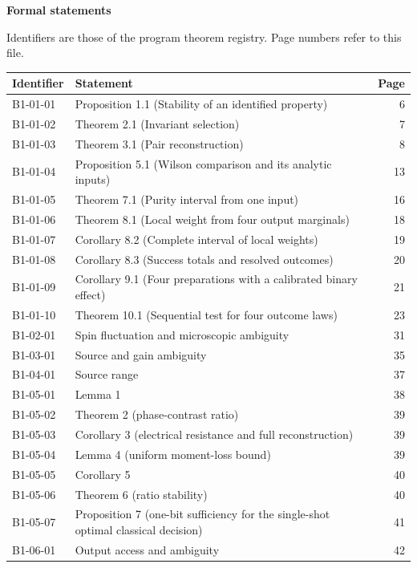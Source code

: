 \documentclass[11pt,a4paper]{article}
\begin{document}
\vspace{2mm}\textbf{Formal statements}\par\vspace{1mm}
{\footnotesize Identifiers are those of the program theorem registry. Page numbers refer to this file.\par}
{\footnotesize\begin{longtable}{@{}l>{\raggedright\arraybackslash}p{}r@{}}
\toprule Identifier & Statement & Page\\\midrule\endhead
B1-01-01 & Proposition 1.1 (Stability of an identified property) & 6\\
B1-01-02 & Theorem 2.1 (Invariant selection) & 7\\
B1-01-03 & Theorem 3.1 (Pair reconstruction) & 8\\
B1-01-04 & Proposition 5.1 (Wilson comparison and its analytic inputs) & 13\\
B1-01-05 & Theorem 7.1 (Purity interval from one input) & 16\\
B1-01-06 & Theorem 8.1 (Local weight from four output marginals) & 18\\
B1-01-07 & Corollary 8.2 (Complete interval of local weights) & 19\\
B1-01-08 & Corollary 8.3 (Success totals and resolved outcomes) & 20\\
B1-01-09 & Corollary 9.1 (Four preparations with a calibrated binary effect) & 21\\
B1-01-10 & Theorem 10.1 (Sequential test for four outcome laws) & 23\\
B1-02-01 & Spin fluctuation and microscopic ambiguity & 31\\
B1-03-01 & Source and gain ambiguity & 35\\
B1-04-01 & Source range & 37\\
B1-05-01 & Lemma 1 & 38\\
B1-05-02 & Theorem 2 (phase-contrast ratio) & 39\\
B1-05-03 & Corollary 3 (electrical resistance and full reconstruction) & 39\\
B1-05-04 & Lemma 4 (uniform moment-loss bound) & 39\\
B1-05-05 & Corollary 5 & 40\\
B1-05-06 & Theorem 6 (ratio stability) & 40\\
B1-05-07 & Proposition 7 (one-bit sufficiency for the single-shot optimal classical decision) & 41\\
B1-06-01 & Output access and ambiguity & 42\\

\end{longtable}}
\end{document}
